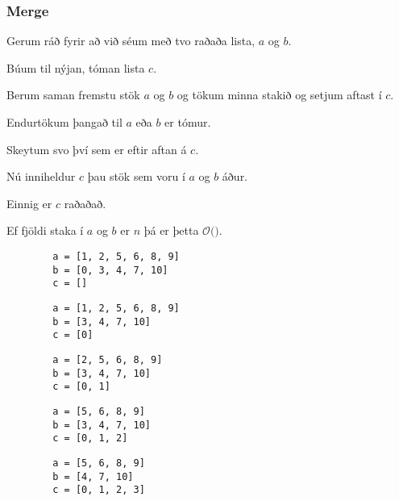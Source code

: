 {
	\frametitle{Merge}
	{
		\item<1-> Gerum ráð fyrir að við séum með tvo raðaða lista, $a$ og $b$.
		\item<2-> Búum til nýjan, tóman lista $c$.
		\item<3-> Berum saman fremstu stök $a$ og $b$ og tökum minna stakið og setjum aftast í $c$.
		\item<4-> Endurtökum þangað til $a$ eða $b$ er tómur.
		\item<5-> Skeytum svo því sem er eftir aftan á $c$.
		\item<6-> Nú inniheldur $c$ þau stök sem voru í $a$ og $b$ áður.
		\item<7-> Einnig er $c$ raðaðað.
		\item<8-> Ef fjöldi staka í $a$ og $b$ er $n$ þá er þetta $\mathcal{O}($\onslide<9->{$\,n\,$}$)$.
	}
}

\begin{frame}[fragile]
\begin{verbatim}
        a = [1, 2, 5, 6, 8, 9]
        b = [0, 3, 4, 7, 10]
        c = []
\end{verbatim}
\end{frame}
\addtocounter{framenumber}{-1}

\begin{frame}[fragile]
\begin{verbatim}
        a = [1, 2, 5, 6, 8, 9]
        b = [3, 4, 7, 10]
        c = [0]
\end{verbatim}
\end{frame}
\addtocounter{framenumber}{-1}

\begin{frame}[fragile]
\begin{verbatim}
        a = [2, 5, 6, 8, 9]
        b = [3, 4, 7, 10]
        c = [0, 1]
\end{verbatim}
\end{frame}
\addtocounter{framenumber}{-1}

\begin{frame}[fragile]
\begin{verbatim}
        a = [5, 6, 8, 9]
        b = [3, 4, 7, 10]
        c = [0, 1, 2]
\end{verbatim}
\end{frame}
\addtocounter{framenumber}{-1}

\begin{frame}[fragile]
\begin{verbatim}
        a = [5, 6, 8, 9]
        b = [4, 7, 10]
        c = [0, 1, 2, 3]
\end{verbatim}
\end{frame}
\addtocounter{framenumber}{-1}

